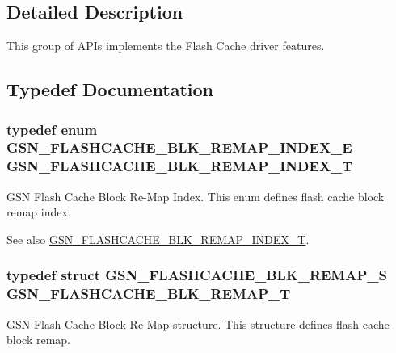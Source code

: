 \subsection{Detailed Description}
This group of APIs implements the Flash Cache driver features. 

\subsection{Typedef Documentation}
\hypertarget{a00646_ga3d33b7f8285642e9406d19bb0af79b2f}{
\subsubsection[{GSN\_\-FLASHCACHE\_\-BLK\_\-REMAP\_\-INDEX\_\-T}]{\setlength{\rightskip}{0pt plus 5cm}typedef enum {\bf GSN\_\-FLASHCACHE\_\-BLK\_\-REMAP\_\-INDEX\_\-E}  {\bf GSN\_\-FLASHCACHE\_\-BLK\_\-REMAP\_\-INDEX\_\-T}}}
\label{a00646_ga3d33b7f8285642e9406d19bb0af79b2f}


GSN Flash Cache Block Re-\/Map Index. This enum defines flash cache block remap index. 

\begin{DoxySeeAlso}{See also}
\hyperlink{a00646_ga3d33b7f8285642e9406d19bb0af79b2f}{GSN\_\-FLASHCACHE\_\-BLK\_\-REMAP\_\-INDEX\_\-T}. 
\end{DoxySeeAlso}
\hypertarget{a00646_gaae9fda1c44c958d868f7cf116897bfc5}{
\subsubsection[{GSN\_\-FLASHCACHE\_\-BLK\_\-REMAP\_\-T}]{\setlength{\rightskip}{0pt plus 5cm}typedef struct {\bf GSN\_\-FLASHCACHE\_\-BLK\_\-REMAP\_\-S}  {\bf GSN\_\-FLASHCACHE\_\-BLK\_\-REMAP\_\-T}}}
\label{a00646_gaae9fda1c44c958d868f7cf116897bfc5}


GSN Flash Cache Block Re-\/Map structure. This structure defines flash cache block remap. 

